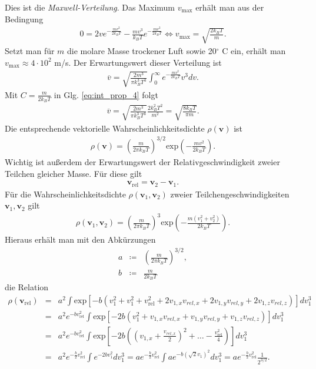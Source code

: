 \documentclass{book}
\newcommand\newoverline[1]{%
\overline{#1}}
\renewcommand{\exp}{\text{exp}}
\begin{document}
%
Dies ist die \textit{Maxwell-Verteilung}. Das Maximum $v_{\text{max}}$ erhält man aus der Bedingung
%
\begin{eqnarray}
0 = 2ve^{-\frac{mv^2}{2k_BT}} - \frac{mv^3}{k_BT}e^{-\frac{mv^2}{2k_BT}} \Leftrightarrow v_{\text{max}} = \sqrt{\frac{2k_BT}{m}}.
\end{eqnarray}
%
Setzt man für $m$ die molare Masse trockener Luft sowie 20$^\circ$ C ein, erhält man $v_{\text{max}} \approx 4\cdot 10^2$ m/s. Der Erwartungswert dieser Verteilung ist
%
\begin{eqnarray}
\newoverline{v} = \sqrt{\frac{2m^3}{\pi k_B^3T^3}}\int_{0}^{\infty}e^{-\frac{mv^2}{2k_BT}}v^3dv.
\end{eqnarray}
%
Mit $C = \frac{m}{2k_BT}$ in Glg. \eqref{eq:int_prop_4} folgt
%
\begin{eqnarray}
\newoverline{v} = \sqrt{\frac{2m^3}{\pi k_B^3T^3}}\frac{2k_B^2T^2}{m^2} = \sqrt{\frac{8k_BT}{\pi m}}.
\end{eqnarray}
%
Die entsprechende vektorielle Wahrscheinlichkeitsdichte $\rho\left(\mathbf{v}\right)$ ist
%
\begin{eqnarray}
\rho\left(\mathbf{v}\right) = \left(\frac{m}{2\pi k_BT}\right)^{3/2}\exp\left(-\frac{mv^2}{2k_BT}\right).\label{eq:maxwellverteilung_vektoriell}
\end{eqnarray}
%
Wichtig ist außerdem der Erwartungswert der Relativgeschwindigkeit zweier Teilchen gleicher Masse. Für diese gilt
%
\begin{eqnarray}
\mathbf{v}_{\text{rel}} = \mathbf{v}_2 - \mathbf{v}_1.
\end{eqnarray}
%
Für die Wahrscheinlichkeitsdichte $\rho\left(\mathbf{v}_1, \mathbf{v}_2\right)$ zweier Teilchengeschwindigkeiten $\mathbf{v}_1, \mathbf{v}_2$ gilt
%
\begin{eqnarray}
\rho\left(\mathbf{v}_1, \mathbf{v}_2\right) = \left(\frac{m}{2\pi k_BT}\right)^3\exp\left(-\frac{m\left(v_1^2 + v_2^2\right)}{2k_BT}\right).
\end{eqnarray}
%
Hieraus erhält man mit den Abkürzungen
%
\begin{eqnarray}
a& \coloneqq &\left(\frac{m}{2\pi k_BT}\right)^{3/2},\\
b& \coloneqq &\frac{m}{2k_BT}
\end{eqnarray}
%
die Relation
%
\begin{eqnarray}
\rho\left(\mathbf{v}_{\text{rel}}\right) & = & a^2\int\exp\left[-b\left(v_1^2 + v_1^2 + v_{\text{rel}}^2 + 2v_{1, x}v_{rel, x} + 2v_{1, y}v_{rel, y} + 2v_{1, z}v_{rel, z}\right)\right]dv_1^3\nonumber\\
& = & a^2e^{-bv_{\text{rel}}^2}\int\exp\left[-2b\left(v_1^2 + v_{1, x}v_{rel, x} + v_{1, y}v_{rel, y} + v_{1, z}v_{rel, z}\right)\right]dv_1^3\nonumber\\
& = & a^2e^{-bv_{\text{rel}}^2}\int\exp\left[-2b\left(\left(v_{1, x} + \frac{v_{rel, x}}{2}\right)^2 + \dotsc - \frac{v_{\text{rel}}^2}{4}\right)\right]dv_1^3\nonumber\\
& = & a^2e^{-\frac{b}{2}v_{\text{rel}}^2}\int e^{-2bv_1^2}dv_1^3 = ae^{-\frac{b}{2}v_{\text{rel}}^2}\int ae^{-b\left(\sqrt{2}v_1\right)^2}dv_1^3 = ae^{-\frac{b}{2}v_{\text{rel}}^2}\frac{1}{2^{3/2}}.
\end{eqnarray}
\end{document}
